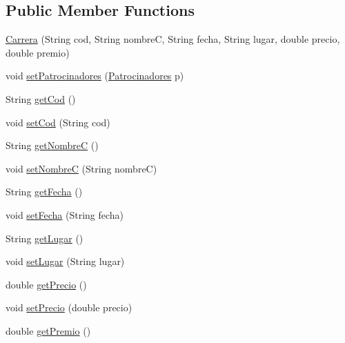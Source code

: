 \subsection*{Public Member Functions}
\begin{DoxyCompactItemize}
\item 
\mbox{\hyperlink{classes_1_1deusto_1_1server_1_1jdo_1_1_carrera_abab4ccd232d2b18ee46d2bf9e01c7363}{Carrera}} (String cod, String nombreC, String fecha, String lugar, double precio, double premio)
\item 
void \mbox{\hyperlink{classes_1_1deusto_1_1server_1_1jdo_1_1_carrera_a0dab3c7d48d078f92bdde687ddaa8390}{set\+Patrocinadores}} (\mbox{\hyperlink{classes_1_1deusto_1_1server_1_1jdo_1_1_patrocinadores}{Patrocinadores}} p)
\item 
String \mbox{\hyperlink{classes_1_1deusto_1_1server_1_1jdo_1_1_carrera_a7d040dc8ca8b8c03ab6bcc1f470aae64}{get\+Cod}} ()
\item 
void \mbox{\hyperlink{classes_1_1deusto_1_1server_1_1jdo_1_1_carrera_aaea3763e7d08c9751ba9a2219b0c1642}{set\+Cod}} (String cod)
\item 
String \mbox{\hyperlink{classes_1_1deusto_1_1server_1_1jdo_1_1_carrera_a2fbdeca20ebef10040241fb0d6ef91da}{get\+NombreC}} ()
\item 
void \mbox{\hyperlink{classes_1_1deusto_1_1server_1_1jdo_1_1_carrera_afba01b2dd581b16f906961f626c96f07}{set\+NombreC}} (String nombreC)
\item 
String \mbox{\hyperlink{classes_1_1deusto_1_1server_1_1jdo_1_1_carrera_a5f71e8e338816f44709f4539a5b85915}{get\+Fecha}} ()
\item 
void \mbox{\hyperlink{classes_1_1deusto_1_1server_1_1jdo_1_1_carrera_a1a2a42d5c92d4e0e1113d6b7571f03b9}{set\+Fecha}} (String fecha)
\item 
String \mbox{\hyperlink{classes_1_1deusto_1_1server_1_1jdo_1_1_carrera_a52ac2d13359792631f5ab7ea6a030092}{get\+Lugar}} ()
\item 
void \mbox{\hyperlink{classes_1_1deusto_1_1server_1_1jdo_1_1_carrera_a5a9a8e9b26160e033b6246a8ea1a523f}{set\+Lugar}} (String lugar)
\item 
double \mbox{\hyperlink{classes_1_1deusto_1_1server_1_1jdo_1_1_carrera_ac86d4089cc5bd95211048a8946b57044}{get\+Precio}} ()
\item 
void \mbox{\hyperlink{classes_1_1deusto_1_1server_1_1jdo_1_1_carrera_ad573b2a0fbfe4889940497e81f5840aa}{set\+Precio}} (double precio)
\item 
double \mbox{\hyperlink{classes_1_1deusto_1_1server_1_1jdo_1_1_carrera_ad9837a1b0c4f2cf392fd44ac6e6b779d}{get\+Premio}} ()

\end{DoxyCompactItemize}
